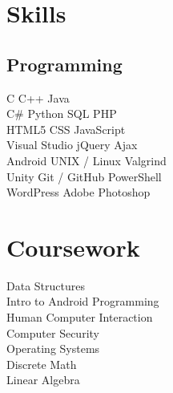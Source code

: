 \documentclass[letterpaper]{deedy-resume} %
\newcommand{\CS}{C\#}
\begin{document}
\begin{minipage}[t]{0.33\textwidth}
\sectionspace %


\section{Skills}

\subsection{Programming}

C \textbullet{} C++ \textbullet{} Java \\
\CS{} \textbullet{} Python \textbullet{} SQL \textbullet{} PHP \\
HTML5 \textbullet{} CSS \textbullet{} JavaScript \\
Visual Studio \textbullet{} jQuery \textbullet{} Ajax \\
Android \textbullet{} UNIX / Linux \textbullet{} Valgrind \\
Unity \textbullet{} Git / GitHub \textbullet{} PowerShell \\
WordPress \textbullet{} Adobe Photoshop

\sectionspace %



\section{Coursework}

Data Structures \\
Intro to Android Programming \\
Human Computer Interaction \\
Computer Security \\
Operating Systems \\
Discrete Math \\
Linear Algebra

\sectionspace %



\end{minipage}
\end{document}
